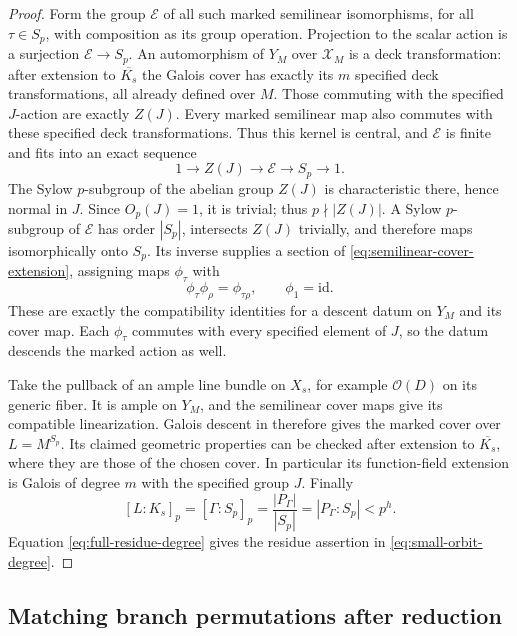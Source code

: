 \begin{proof}
Form the group $\mathcal E$ of all such marked semilinear isomorphisms,
for all $\tau\in S_p$, with composition as its group operation.
Projection to the scalar action is a surjection $\mathcal E\to S_p$.
An automorphism of $Y_M$ over $\mathcal X_M$ is a deck transformation: after
extension to $\overline{K_s}$ the Galois cover has exactly its $m$
specified deck transformations, all already defined over $M$.
Those commuting with the specified $J$-action are exactly $Z(J)$.
Every marked semilinear map also commutes with these specified deck
transformations. Thus this kernel is central, and $\mathcal E$ is
finite and fits into an exact sequence
\begin{equation}\label{eq:semilinear-cover-extension}
                  1\longrightarrow Z(J)\longrightarrow\mathcal E
                     \longrightarrow S_p\longrightarrow1.
\end{equation}
The Sylow $p$-subgroup of the abelian group $Z(J)$ is characteristic
there, hence normal in $J$.  Since $O_p(J)=1$, it is trivial; thus
$p\nmid|Z(J)|$.
A Sylow $p$-subgroup of $\mathcal E$ has order $|S_p|$, intersects
$Z(J)$ trivially, and therefore maps isomorphically onto $S_p$.
Its inverse supplies a section of \eqref{eq:semilinear-cover-extension},
assigning maps $\phi_\tau$ with
\[
 \phi_\tau\phi_\rho=\phi_{\tau\rho},\qquad \phi_1=\mathrm{id}.
\]
These are exactly the compatibility identities for a descent datum on
$Y_M$ and its cover map. Each $\phi_\tau$ commutes with every specified
element of $J$, so the datum descends the marked action as well.

Take the pullback of an ample line bundle on $X_s$, for example
$\mathcal O(D)$ on its generic fiber.  It is ample on $Y_M$, and the
semilinear cover maps give its compatible linearization.
Galois descent in  therefore gives the marked
cover over $L=M^{S_p}$.  Its claimed geometric properties can be checked
after extension to $\overline{K_s}$, where they are those of the chosen
cover.  In particular its function-field extension is Galois of degree
$m$ with the specified group $J$.
Finally
\[
 [L:K_s]_p=[\Gamma:S_p]_p
       =\frac{|P_\Gamma|}{|S_p|}
       =|P_\Gamma:S_p|<p^h.
\]
Equation \eqref{eq:full-residue-degree} gives the residue assertion in
\eqref{eq:small-orbit-degree}.
\end{proof}

\subsection{Matching branch permutations after reduction}

